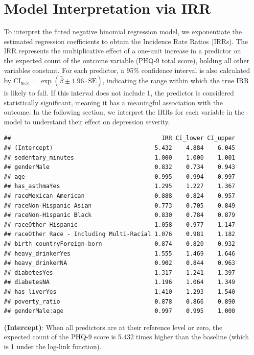 \documentclass[
  11pt,
]{article}
\begin{document}
\section{Model Interpretation via IRR}\label{model-interpretation-via-irr}

To interpret the fitted negative binomial regression model, we exponentiate the estimated regression coefficients to obtain the Incidence Rate Ratios (IRRs). The IRR represents the multiplicative effect of a one-unit increase in a predictor on the expected count of the outcome variable (PHQ-9 total score), holding all other variables constant. For each predictor, a 95\% confidence interval is also calculated by \(\text{CI}_{95\%} = \exp\left( \hat{\beta} \pm 1.96 \cdot \text{SE} \right)\), indicating the range within which the true IRR is likely to fall. If this interval does not include 1, the predictor is considered statistically significant, meaning it has a meaningful association with the outcome. In the following section, we interpret the IRRs for each variable in the model to understand their effect on depression severity.

\begin{lstlisting}
##                                           IRR CI_lower CI_upper
## (Intercept)                             5.432    4.884    6.045
## sedentary_minutes                       1.000    1.000    1.001
## genderMale                              0.832    0.734    0.943
## age                                     0.995    0.994    0.997
## has_asthmaYes                           1.295    1.227    1.367
## raceMexican American                    0.888    0.824    0.957
## raceNon-Hispanic Asian                  0.773    0.705    0.849
## raceNon-Hispanic Black                  0.830    0.784    0.879
## raceOther Hispanic                      1.058    0.977    1.147
## raceOther Race - Including Multi-Racial 1.076    0.981    1.182
## birth_countryForeign-born               0.874    0.820    0.932
## heavy_drinkerYes                        1.555    1.469    1.646
## heavy_drinkerNA                         0.902    0.844    0.963
## diabetesYes                             1.317    1.241    1.397
## diabetesNA                              1.196    1.064    1.349
## has_liverYes                            1.410    1.293    1.540
## poverty_ratio                           0.878    0.866    0.890
## genderMale:age                          0.997    0.995    1.000
\end{lstlisting}

\textbf{(Intercept)}: When all predictors are at their reference level or zero, the expected count of the PHQ-9 score is 5.432 times higher than the baseline (which is 1 under the log-link function).
\end{document}
